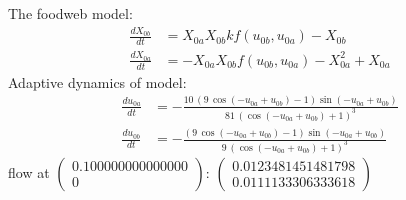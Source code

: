 \documentclass{article}
\begin{document}
The foodweb model:
\[\begin{align*}
\frac{dX_{0b}}{dt} &= X_{0a} X_{0b} k f\left(u_{0b}, u_{0a}\right) - X_{0b}\\
\frac{dX_{0a}}{dt} &= -X_{0a} X_{0b} f\left(u_{0b}, u_{0a}\right) - X_{0a}^{2} + X_{0a}
\end{align*}\]
Adaptive dynamics of model:
\begin{align*}
\frac{du_{0a}}{dt} &= -\frac{10 \, {\left(9 \, \cos\left(-u_{0a} + u_{0b}\right) - 1\right)} \sin\left(-u_{0a} + u_{0b}\right)}{81 \, {\left(\cos\left(-u_{0a} + u_{0b}\right) + 1\right)}^{3}}\\
\frac{du_{0b}}{dt} &= -\frac{{\left(9 \, \cos\left(-u_{0a} + u_{0b}\right) - 1\right)} \sin\left(-u_{0a} + u_{0b}\right)}{9 \, {\left(\cos\left(-u_{0a} + u_{0b}\right) + 1\right)}^{3}}
\end{align*}flow at $\left(\begin{array}{c}
  0.100000000000000\\
  0
\end{array}\right)$: $\left(\begin{array}{c}
  0.0123481451481798\\
  0.0111133306333618
\end{array}\right)$
\end{document}
